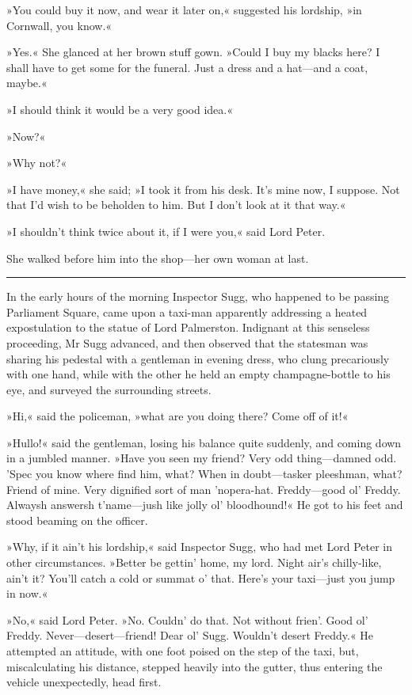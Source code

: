 »You could buy it now, and wear it later on,« suggested his lordship, »in Cornwall, you know.«

»Yes.« She glanced at her brown stuff gown. »Could I buy my blacks here? I shall have to get some for the funeral. Just a dress and a hat\allowbreak---\allowbreak and a coat, maybe.«

»I should think it would be a very good idea.«

»Now?«

»Why not?«

»I have money,« she said; »I took it from his desk. It's mine now, I suppose. Not that I'd wish to be beholden to him. But I don't look at it that way.«

»I shouldn't think twice about it, if I were you,« said Lord Peter.

She walked before him into the shop\allowbreak---\allowbreak her own woman at last. 

\noindent\hfil\rule{0.5\textwidth}{.4pt}\hfil 

In the early hours of the morning Inspector Sugg, who happened to be passing Parliament Square, came upon a taxi-man apparently addressing a heated expostulation to the statue of Lord Palmerston. Indignant at this senseless proceeding, Mr Sugg advanced, and then observed that the statesman was sharing his pedestal with a gentleman in evening dress, who clung precariously with one hand, while with the other he held an empty champagne-bottle to his eye, and surveyed the surrounding streets.

»Hi,« said the policeman, »what are you doing there? Come off of it!«

»Hullo!« said the gentleman, losing his balance quite suddenly, and coming down in a jumbled manner. »Have you seen my friend? Very odd thing\allowbreak---\allowbreak damned odd. 'Spec you know where find him, what? When in doubt\allowbreak---\allowbreak tasker pleeshman, what? Friend of mine. Very dignified sort of man 'nopera-hat. Freddy\allowbreak---\allowbreak good ol' Freddy. Alwaysh answersh t'name\allowbreak---\allowbreak jush like jolly ol' bloodhound!« He got to his feet and stood beaming on the officer.

»Why, if it ain't his lordship,« said Inspector Sugg, who had met Lord Peter in other circumstances. »Better be gettin' home, my lord. Night air's chilly-like, ain't it? You'll catch a cold or summat o' that.  Here's your taxi\allowbreak---\allowbreak just you jump in now.«

»No,« said Lord Peter. »No. Couldn' do that. Not without frien'. Good ol' Freddy. Never\allowbreak---\allowbreak desert---friend! Dear ol' Sugg. Wouldn't desert Freddy.« He attempted an attitude, with one foot poised on the step of the taxi, but, miscalculating his distance, stepped heavily into the gutter, thus entering the vehicle unexpectedly, head first.

